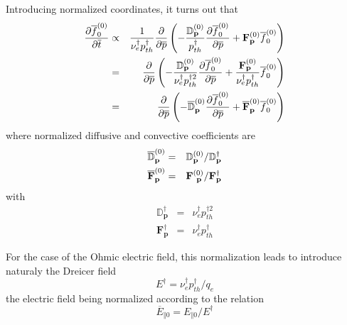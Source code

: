 Introducing normalized coordinates, it turns out that 
\begin{eqnarray}
\frac{\partial \overline{f}_{0}^{\left( 0\right) }}{\partial \overline{t}}
&\propto &\frac{1}{\nu _{e}^{\dag }p_{th}^{\dag }}\frac{\partial }{\partial 
\overline{p}}\left( -\frac{\mathbb{D}_{\mathbf{p}}^{\left( 0\right) }}{%
p_{th}^{\dag }}\frac{\partial \overline{f}_{0}^{\left( 0\right) }}{\partial 
\overline{p}}+\mathbf{F}_{\mathbf{p}}^{\left( 0\right) }\overline{f}%
_{0}^{\left( 0\right) }\right)  \notag \\
&=&\frac{\partial }{\partial \overline{p}}\left( -\frac{\mathbb{D}_{\mathbf{p%
}}^{\left( 0\right) }}{\nu _{e}^{\dag }p_{th}^{\dag 2}}\frac{\partial 
\overline{f}_{0}^{\left( 0\right) }}{\partial \overline{p}}+\frac{\mathbf{F}%
_{\mathbf{p}}^{\left( 0\right) }}{\nu _{e}^{\dag }p_{th}^{\dag }}\overline{f}%
_{0}^{\left( 0\right) }\right)  \notag \\
&=&\frac{\partial }{\partial \overline{p}}\left( -\overline{\mathbb{D}}_{%
\mathbf{p}}^{\left( 0\right) }\frac{\partial \overline{f}_{0}^{\left(
0\right) }}{\partial \overline{p}}+\overline{\mathbf{F}}_{\mathbf{p}
}^{\left( 0\right) }\overline{f}_{0}^{\left( 0\right) }\right)
\end{eqnarray}
where normalized diffusive and convective coefficients are 
\begin{eqnarray}
\overline{\mathbb{D}}_{\mathbf{p}}^{\left( 0\right) } &=&\mathbb{D}_{\mathbf{%
p}}^{\left( 0\right) }/\mathbb{D}_{\mathbf{p}}^{\dag } \\
\overline{\mathbf{F}}_{\mathbf{p}}^{\left( 0\right) } &=&\mathbf{F}_{\mathbf{%
\ p}}^{\left( 0\right) }/\mathbf{F}_{\mathbf{p}}^{\dag }
\end{eqnarray}
with 
\begin{eqnarray}
\mathbb{D}_{\mathbf{p}}^{\dag } &=&\nu _{e}^{\dag }p_{th}^{\dag 2} \\
\mathbf{F}_{\mathbf{p}}^{\dag } &=&\nu _{e}^{\dag }p_{th}^{\dag }
\end{eqnarray}

For the case of the Ohmic electric field, this normalization leads to
introduce naturaly the Dreicer field 
\begin{equation}
E^{\dag }=\nu _{e}^{\dag }p_{th}^{\dag }/q_{e}
\end{equation}
the electric field being normalized according to the relation 
\begin{equation}
\overline{E}_{\Vert 0}=E_{\Vert 0}/E^{\dag }
\end{equation}

